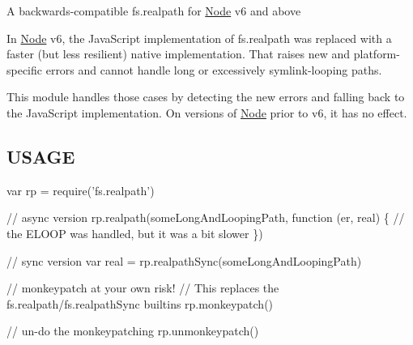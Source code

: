 A backwards-\/compatible fs.\+realpath for \mbox{\hyperlink{classNode}{Node}} v6 and above

In \mbox{\hyperlink{classNode}{Node}} v6, the Java\+Script implementation of fs.\+realpath was replaced with a faster (but less resilient) native implementation. That raises new and platform-\/specific errors and cannot handle long or excessively symlink-\/looping paths.

This module handles those cases by detecting the new errors and falling back to the Java\+Script implementation. On versions of \mbox{\hyperlink{classNode}{Node}} prior to v6, it has no effect.

\subsection*{U\+S\+A\+GE}


\begin{DoxyCode}
var rp = require('fs.realpath')

// async version
rp.realpath(someLongAndLoopingPath, function (er, real) \{
  // the ELOOP was handled, but it was a bit slower
\})

// sync version
var real = rp.realpathSync(someLongAndLoopingPath)

// monkeypatch at your own risk!
// This replaces the fs.realpath/fs.realpathSync builtins
rp.monkeypatch()

// un-do the monkeypatching
rp.unmonkeypatch()
\end{DoxyCode}
 